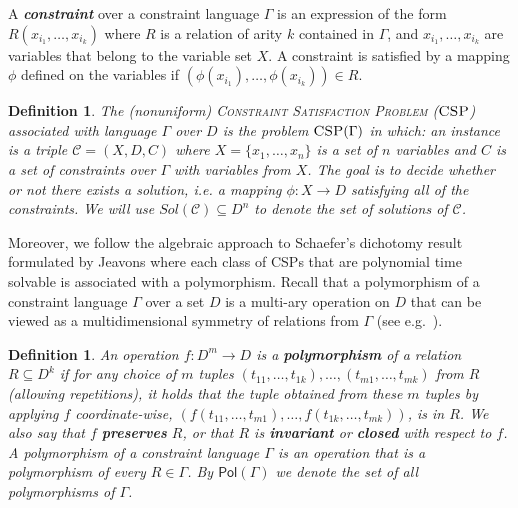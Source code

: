 \documentclass[11pt]{article}
\newcommand{\Cc}{\mathcal{C}}
\newcommand{\CSP}{\textsc{CSP}}
\newcommand{\Pol}{\textsf{Pol}}
\newcommand{\1}{\textbf{1}}
\newtheorem{definition}[theorem]{Definition}
\begin{document}
A \emph{\textbf{constraint}} over a constraint language $\Gamma$ is an expression of the form $R(x_{i_1},\ldots, x_{i_k})$ where $R$ is a relation of arity $k$ contained in $\Gamma$, and $x_{i_1},\ldots, x_{i_k}$ are variables that belong to the variable set $X$. A constraint is satisfied by a mapping $\phi$ defined on the variables if $(\phi(x_{i_1}),\ldots, \phi(x_{i_k}))\in R$.

\begin{definition}\label{def:csp}
 The \emph{(nonuniform) \textsc{Constraint Satisfaction Problem} ($\CSP$)} associated with language $\Gamma$ over $D$ is the problem $\CSP(\Gamma)$ in which: an instance is a triple $\Cc=(X,D,C)$ where $X=\{x_1,\ldots,x_n\}$ is a set of $n$ variables and $C$  is a set of constraints over $\Gamma$ with variables from $X$. The goal is to decide whether or not there exists a solution, i.e. a mapping $\phi: X\rightarrow D$ satisfying all of the constraints. We will use $Sol(\Cc)\subseteq D^n$ to denote the set of solutions of $\Cc$.
\end{definition}
Moreover, we follow the algebraic approach to Schaefer's dichotomy result \cite{Schaefer78} formulated by Jeavons \cite{JEAVONS1998185} where each class of CSPs that are polynomial time solvable is associated with a polymorphism.
Recall that a polymorphism of a constraint language $\Gamma$ over a set $D$ is a multi-ary operation on $D$ that can be viewed as a multidimensional symmetry of relations from $\Gamma$ (see e.g.~\cite{barto_et_al:DFU:2017:6959}).
\begin{definition}\label{def:polymorph}
An operation $f:D^m \rightarrow D$ is a \textbf{polymorphism} of a relation $R\subseteq D^k$ if for any choice of $m$ tuples $(t_{11},\dots,t_{1k}),\dots,(t_{m1},\dots,t_{mk})$ from $R$ (allowing repetitions), it holds that the tuple obtained from these $m$ tuples by applying $f$ coordinate-wise, $(f(t_{11},\dots,t_{m1}),\dots,f(t_{1k},\dots,t_{mk}))$, is in $R$. We also say that $f$ \textbf{preserves} $R$, or that $R$ is \textbf{invariant} or \textbf{closed} with respect to $f$. A polymorphism of a constraint language $\Gamma$ is an operation that is a polymorphism of every $R\in \Gamma$. By $\Pol(\Gamma)$ we denote the set of all polymorphisms of $\Gamma$. 
\end{definition}




\end{document}
